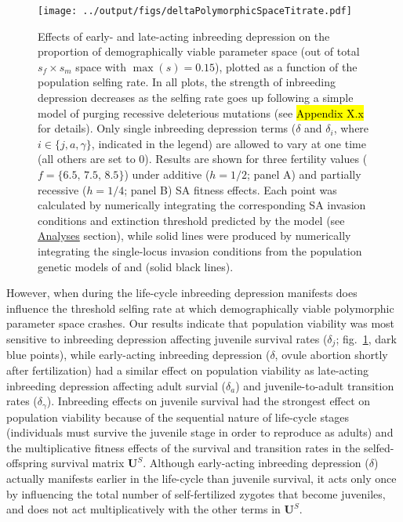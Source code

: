 \documentclass[11pt]{article}
\def\mbf#1{\mathbf{#1}}
\begin{document}
 \begin{figure}[htbp]
 \centering
 \texttt{[image: ../output/figs/deltaPolymorphicSpaceTitrate.pdf]}
 \caption{\footnotesize{Effects of early- and late-acting inbreeding depression on the proportion of demographically viable parameter space (out of total $s_f \times s_m$ space with $\max(s) = 0.15$), plotted as a function of the population selfing rate. In all plots, the strength of inbreeding depression decreases as the selfing rate goes up following a simple model of purging recessive deleterious mutations (see \hl{Appendix X.x} for details). Only single inbreeding depression terms ($\delta$ and $\delta_i$, where $i \in \{j,a,\gamma\}$, indicated in the legend) are allowed to vary at one time (all others are set to $0$). Results are shown for three fertility values ($f = \{6.5,\,7.5,\,8.5\}$) under additive ($h = 1/2$; panel A) and partially recessive ($h = 1/4$; panel B) SA fitness effects. Each point was calculated by numerically integrating the corresponding SA invasion conditions and extinction threshold predicted by the model (see \hyperref[subsec:analyses]{Analyses} section), while solid lines were produced by numerically integrating the single-locus invasion conditions from the population genetic models of \citet{JordanConnallon2014} and \citet{Olito2017} (solid black lines).}} 
 \label{fig:deltaPolySpace}
 \end{figure}


However, when during the life-cycle inbreeding depression manifests does influence the threshold selfing rate at which demographically viable polymorphic parameter space crashes. Our results indicate that population viability was most sensitive to inbreeding depression affecting juvenile survival rates ($\delta_j$; fig.~\ref{fig:deltaPolySpace}, dark blue points), while early-acting inbreeding depression ($\delta$, ovule abortion shortly after fertilization) had a similar effect on population viability as late-acting inbreeding depression affecting adult survial ($\delta_a$) and juvenile-to-adult transition rates ($\delta_{\gamma}$). Inbreeding effects on juvenile survival had the strongest effect on population viability because of the sequential nature of life-cycle stages (individuals must survive the juvenile stage in order to reproduce as adults) and the multiplicative fitness effects of the survival and transition rates in the selfed-offspring survival matrix $\mbf{U}^{S}$. Although early-acting inbreeding depression ($\delta$) actually manifests earlier in the life-cycle than juvenile survival, it acts only once by influencing the total number of self-fertilized zygotes that become juveniles, and does not act multiplicatively with the other terms in $\mbf{U}^{S}$.
\end{document}
